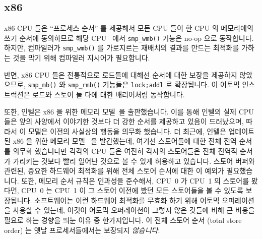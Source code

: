 \subsection{x86}

x86 CPU 들은 ``프로세스 순서'' 를 제공해서 모든 CPU 들이 한 CPU 의 메모리에의
쓰기 순서에 동의하므로 해당 CPU~\cite{IntelXeonV3-96a} 에서 {\tt smp\_wmb()}
기능은 no-op 으로 동작합니다.
하지만, 컴파일러가 {\tt smp\_wmb()} 를 가로지르는 재배치의 결과를 만드는
최적화를 가하는 것을 막기 위해 컴파일러 지시어가 필요합니다.

반면, x86 CPU 들은 전통적으로 로드들에 대해선 순서에 대한 보장을 제공하지
않았으므로, {\tt smp\_mb()} 와 {\tt smp\_rmb()} 기능들은 {\tt lock;addl} 로
확장됩니다.
이 어토믹 인스트럭션은 로드와 스토어 둘 다에 대한 배리어처럼 동작합니다.

또한, 인텔은 x86 을 위한 메모리 모델~\cite{Intelx86MemoryOrdering2007}을
출판했습니다.
이를 통해 인텔의 실제 CPU 들은 앞의 사양에서 이야기한 것보다 더 강한 순서를
제공하고 있음이 드러났으며, 따라서 이 모델은 이전의 사실상의 행동을 의무화
했습니다.
더 최근에, 인텔은 업데이트된 x86 을 위한 메모리
모델~\cite[Section8.2]{Intel64IA32v3A2011} 을 발간했는데, 여기선 스토어들에
대한 전체 전역 순서를 의무화 했습니다만 각각의 CPU 들은 여전히 각자의
스토어들은 전체 전역적 순서가 가리키는 것보다 빨리 일어난 것으로 볼 수 있게
허용하고 있습니다.
스토어 버퍼와 관련된, 중요한 하드웨어 최적화를 위해 전체 스토어 순서에 대한 이
예외가 필요했습니다.
또한, 메모리 순서 규칙은 인과성을 준수해서, CPU~0 가 CPU~1 의 스토어를 봤다면,
CPU~0 는 CPU~1 이 그 스토어 이전에 봤던 모든 스토어들을 볼 수 있도록
보장됩니다.
소프트웨어는 이런 하드웨어 최적화를 무효화 하기 위해 어토믹 오퍼레이션을 사용할
수 있는데, 이것이 어토믹 오퍼레이션이 그렇지 않은 것들에 비해 큰 비용을 필요로
하는 경향을 띄눈 이유 중 한가지입니다.
이 전체 스토어 순서 (total store order) 는 옛날 프로세서들에서는 보장되지
\emph{않습니다}.
\iffalse

